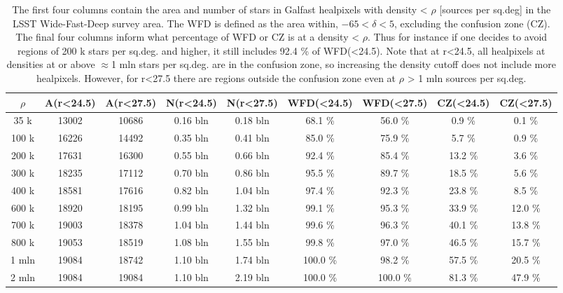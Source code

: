 \documentclass[DM,lsstdraft,toc,usenatbib,authoryear]{lsstdoc}
\begin{document}
\begin{centering}
\begin{table}
\caption{The first four columns contain the area and number of stars  in Galfast healpixels with density < $\rho$ [sources per sq.deg] in the LSST Wide-Fast-Deep survey area. The WFD is defined as the area within, $-65 < \delta < 5$, excluding the confusion zone (CZ). The final four columns inform what percentage of WFD or CZ is at a density  < $\rho$. Thus for instance if one decides to avoid regions of 200 k stars per sq.deg. and higher, it still includes  92.4 \% of WFD(<24.5).
Note that at r<24.5, all healpixels at densities at or above $\approx$1 mln stars per sq.deg. are in  the confusion zone, so increasing the density cutoff does not include more healpixels. However, for r<27.5 there are regions outside the confusion zone even at $\rho$ > 1 mln sources per sq.deg. }
\label{tab:galfast_densities}
\begin{tabular}{ccccccccc}
  \hline
$\rho$ & A(r<24.5) & A(r<27.5) & N(r<24.5) & N(r<27.5) & WFD(<24.5) & WFD(<27.5) & CZ(<24.5) & CZ(<27.5) \\
\hline
35 k & 13002 & 10686 & 0.16 bln & 0.18 bln & 68.1 \% & 56.0 \% & 0.9 \% & 0.1 \% \\
100 k & 16226 & 14492 & 0.35 bln & 0.41 bln & 85.0 \% & 75.9 \% & 5.7 \% & 0.9 \% \\
200 k & 17631 & 16300 & 0.55 bln & 0.66 bln & 92.4 \% & 85.4 \% & 13.2 \% & 3.6 \% \\
300 k & 18235 & 17112 & 0.70 bln & 0.86 bln & 95.5 \% & 89.7 \% & 18.5 \% & 5.6 \% \\
400 k & 18581 & 17616 & 0.82 bln & 1.04 bln & 97.4 \% & 92.3 \% & 23.8 \% & 8.5 \% \\
600 k & 18920 & 18195 & 0.99 bln & 1.32 bln & 99.1 \% & 95.3 \% & 33.9 \% & 12.0 \% \\
700 k & 19003 & 18378 & 1.04 bln & 1.44 bln & 99.6 \% & 96.3 \% & 40.1 \% & 13.8 \% \\
800 k & 19053 & 18519 & 1.08 bln & 1.55 bln & 99.8 \% & 97.0 \% & 46.5 \% & 15.7 \% \\
1 mln & 19084 & 18742 & 1.10 bln & 1.74 bln & 100.0 \% & 98.2 \% & 57.5 \% & 20.5 \% \\
2 mln & 19084 & 19084 & 1.10 bln & 2.19 bln & 100.0 \% & 100.0 \% & 81.3 \% & 47.9 \% \\
\end{tabular}
\end{table}
\end{centering}
\end{document}
